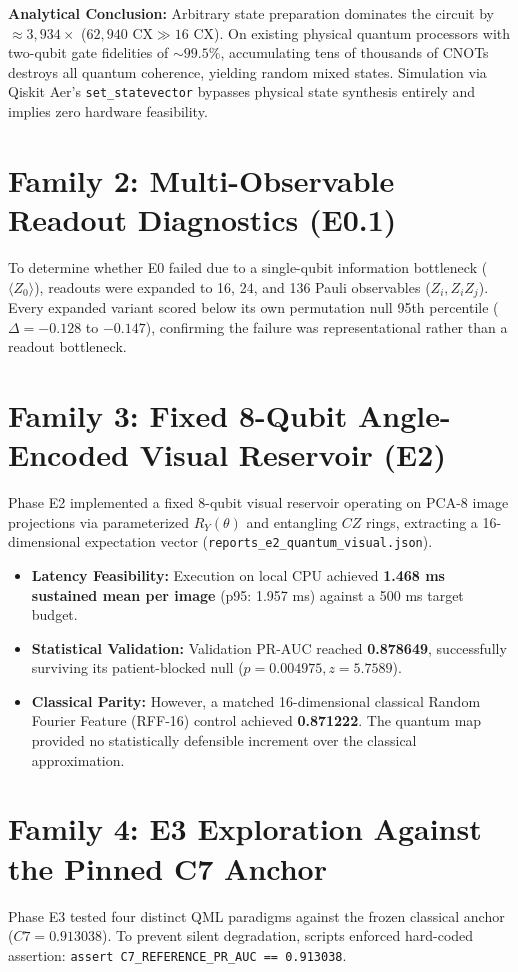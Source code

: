 \documentclass[11pt,a4paper]{report}
\newcommand{\artifact}[1]{\texttt{\footnotesize #1}}
\begin{document}
\textbf{Analytical Conclusion:} Arbitrary state preparation dominates the circuit by \textbf{$\approx 3,934\times$} ($62,940 \text{ CX} \gg 16 \text{ CX}$). On existing physical quantum processors with two-qubit gate fidelities of $\sim 99.5\%$, accumulating tens of thousands of CNOTs destroys all quantum coherence, yielding random mixed states. Simulation via Qiskit Aer's \texttt{set\_statevector} bypasses physical state synthesis entirely and implies zero hardware feasibility.

\section{Family 2: Multi-Observable Readout Diagnostics (E0.1)}
To determine whether E0 failed due to a single-qubit information bottleneck ($\langle Z_0 \rangle$), readouts were expanded to 16, 24, and 136 Pauli observables ($Z_i, Z_i Z_j$). Every expanded variant scored below its own permutation null 95th percentile ($\Delta = -0.128$ to $-0.147$), confirming the failure was representational rather than a readout bottleneck.

\section{Family 3: Fixed 8-Qubit Angle-Encoded Visual Reservoir (E2)}
Phase E2 implemented a fixed 8-qubit visual reservoir operating on PCA-8 image projections via parameterized $R_Y(\theta)$ and entangling $CZ$ rings, extracting a 16-dimensional expectation vector (\artifact{reports\_e2\_quantum\_visual.json}).
\begin{itemize}
  \item \textbf{Latency Feasibility:} Execution on local CPU achieved \textbf{1.468 ms sustained mean per image} (p95: 1.957 ms) against a 500 ms target budget.
  \item \textbf{Statistical Validation:} Validation PR-AUC reached \textbf{0.878649}, successfully surviving its patient-blocked null ($p = 0.004975, z = 5.7589$).
  \item \textbf{Classical Parity:} However, a matched 16-dimensional classical Random Fourier Feature (RFF-16) control achieved \textbf{0.871222}. The quantum map provided no statistically defensible increment over the classical approximation.
\end{itemize}

\section{Family 4: E3 Exploration Against the Pinned C7 Anchor}
Phase E3 tested four distinct QML paradigms against the frozen classical anchor ($C7 = 0.913038$). To prevent silent degradation, scripts enforced hard-coded assertion: \texttt{assert C7\_REFERENCE\_PR\_AUC == 0.913038}.
\end{document}
